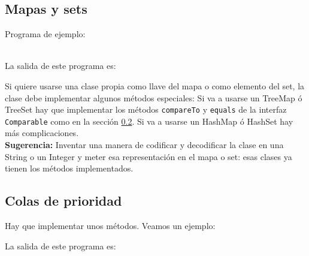 \documentclass[10pt,letterpaper,twocolumn]{article}
\newcommand{\codigofuente}[1]{

\dotfill
}
\begin{document}
\subsection{Mapas y sets}
Programa de ejemplo:
\codigofuente{./src/java/maps_sets.java} \\
La salida de este programa es: \\
\bigskip
\ttfamily
{}
\normalfont\normalsize
\bigskip

Si quiere usarse una clase propia como llave del mapa o como elemento del set, la clase debe implementar
algunos métodos especiales: Si va a usarse un TreeMap ó TreeSet hay que implementar los métodos \texttt{compareTo} y
\texttt{equals} de la interfaz \texttt{Comparable} como en la sección \ref{colas_de_prioridad_java}. Si va a usarse
un HashMap ó HashSet hay más complicaciones.\\
\smallskip
\textbf{Sugerencia:} Inventar una manera de codificar y decodificar la clase en una String o un Integer y meter esa representación en el mapa o set: esas clases ya tienen los métodos implementados.

\subsection{Colas de prioridad}
\label{colas_de_prioridad_java}
Hay que implementar unos métodos. Veamos un ejemplo:

\smallskip

\codigofuente{./src/java/priority_queue.java}

\smallskip

La salida de este programa es:

\smallskip

\ttfamily
{}
\normalfont\normalsize
\end{document}
